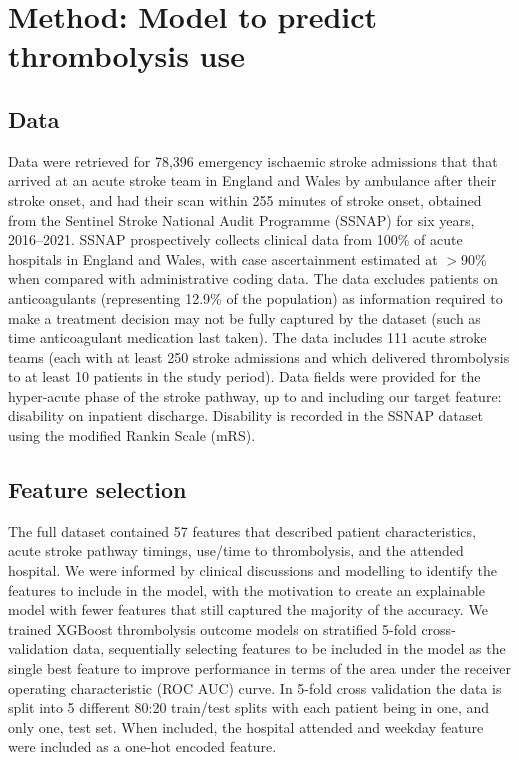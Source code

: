 \section{Method: Model to predict thrombolysis use}

\subsection{Data}

Data were retrieved for 78,396 emergency ischaemic stroke admissions that that arrived at an acute stroke team in England and Wales by ambulance after their stroke onset, and had their scan within 255 minutes of stroke onset, obtained from the Sentinel Stroke National Audit Programme (SSNAP) for six years, 2016–2021. SSNAP prospectively collects clinical data from 100\% of acute hospitals in England and Wales, with case ascertainment estimated at $>$90\% when compared with administrative coding data. The data excludes patients on anticoagulants (representing 12.9\% of the population) as information required to make a treatment decision may not be fully captured by the dataset (such as time anticoagulant medication last taken). The data includes 111 acute stroke teams (each with at least 250 stroke admissions  and which delivered thrombolysis to at least 10 patients in the study period). Data fields were provided for the hyper-acute phase of the stroke pathway, up to and including our target feature: disability on inpatient discharge. Disability is recorded in the SSNAP dataset using the modified Rankin Scale (mRS).


\subsection{Feature selection}

The full dataset contained 57 features that described patient characteristics, acute stroke pathway timings, use/time to thrombolysis, and the attended hospital. We were informed by clinical discussions and modelling to identify the features to include in the model, with the motivation to create an explainable model with fewer features that still captured the majority of the accuracy. We trained XGBoost thrombolysis outcome models on stratified 5-fold cross-validation data, sequentially selecting features to be included in the model as the single best feature to improve performance in terms of the area under the receiver operating characteristic (ROC AUC) curve. In 5-fold cross validation the data is split into 5 different 80:20 train/test splits with each patient being in one, and only one, test set. When included, the hospital attended and weekday feature were included as a one-hot encoded feature.

